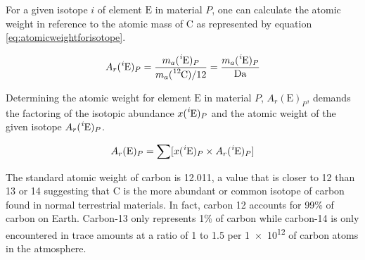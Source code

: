 For a given isotope $i$ of element $\mathrm E$ in material $P$, one can
calculate the atomic weight in reference to the atomic mass of C
as represented by equation \ref{eq:atomicweightforisotope}.

\begin{equation}\label{eq:atomicweightforisotope} A_r(\mathrm { \ce{^i}E })_P =
\frac{ m_a(\mathrm { \ce{^i}E })_P }{ m_a(\mathrm { \ce{^{12}}C })/12 } = \frac{
m_a(\mathrm { \ce{^i}E })_P }{ \si{\dalton} } \end{equation}

Determining the atomic weight for element $\mathrm E$ in material $P$,
$A_r(\mathrm E)_P$, demands the factoring of the isotopic abundance $x(\mathrm {
\ce{^{i}E} })_P$ and the atomic weight of the given isotope $A_r(\mathrm {
\ce{^i}E })_P$.

\begin{equation}\label{eq:atomicweightforelement} A_r(\mathrm E)_P = \sum
[x(\mathrm { \ce{^i}E })_P \times A_r( \mathrm { \ce{^i}E } )_P] \end{equation}

The standard atomic weight of carbon is \num{12.011}\cite{atomic-weights-2013},
a value that is closer to \num{12} than \num{13} or \num{14} suggesting that
C is the more abundant or common isotope of carbon found in normal
terrestrial materials. In fact, carbon 12 accounts for 99\% of carbon on Earth.
Carbon-13 only represents 1\% of carbon while carbon-14 is only encountered in
trace amounts at a ratio of 1 to 1.5 per \num{1e12} of carbon atoms in the
atmosphere.

